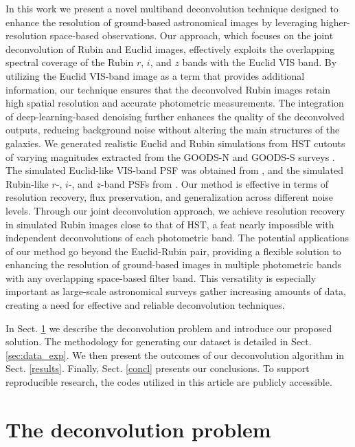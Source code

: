 \documentclass[traditabstract]{aa}
\begin{document}
In this work we present a novel multiband deconvolution technique designed to enhance the resolution of ground-based astronomical images by leveraging higher-resolution space-based observations. Our approach, which focuses on the joint deconvolution of Rubin and Euclid images, effectively exploits the overlapping spectral coverage of the Rubin $r$, $i$, and $z$ bands with the Euclid VIS band. By utilizing the Euclid VIS-band image as a term that provides additional information, our technique ensures that the deconvolved Rubin images retain high spatial resolution and accurate photometric measurements. The integration of deep-learning-based denoising further enhances the quality of the deconvolved outputs, reducing background noise without altering the main structures of the galaxies. We generated realistic Euclid and Rubin simulations from HST cutouts of varying magnitudes extracted from the GOODS-N and GOODS-S surveys \citep{goods}. The simulated Euclid-like VIS-band PSF was obtained from \cite{tobias2022}, and the simulated Rubin-like $r$-, $i$-, and $z$-band PSFs from \cite{lsst_2021}. Our method is effective in terms of resolution recovery, flux preservation, and generalization across different noise levels. Through our joint deconvolution approach, we achieve resolution recovery in simulated Rubin  images close to that of HST, a feat nearly impossible with independent deconvolutions of each photometric band. The potential applications of our method go beyond the Euclid-Rubin pair, providing a flexible solution to enhancing the resolution of ground-based images in multiple photometric bands with any overlapping space-based filter band. This versatility is especially important as large-scale astronomical surveys gather increasing amounts of data, creating a need for effective and reliable deconvolution techniques.

In Sect. \ref{dec_problem} we describe the deconvolution problem and introduce our proposed solution. The methodology for generating our dataset is detailed in Sect. \ref{sec:data_exp}. We then present the outcomes of our deconvolution algorithm in Sect. \ref{results}. Finally, Sect. \ref{concl} presents our conclusions. To support reproducible research, the codes utilized in this article are publicly accessible.


\section{The deconvolution problem}
\label{dec_problem}
\end{document}
